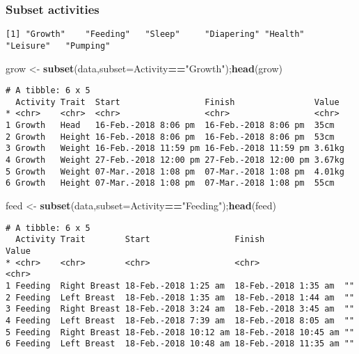 \documentclass[10,portrait]{article}
\newenvironment{Shaded}{\begin{snugshade}}{\end{snugshade}}
\newcommand{\KeywordTok}[1]{\textcolor[rgb]{0.13,0.29,0.53}{\textbf{#1}}}
\newcommand{\DataTypeTok}[1]{\textcolor[rgb]{0.13,0.29,0.53}{#1}}
\newcommand{\StringTok}[1]{\textcolor[rgb]{0.31,0.60,0.02}{#1}}
\newcommand{\OperatorTok}[1]{\textcolor[rgb]{0.81,0.36,0.00}{\textbf{#1}}}
\newcommand{\NormalTok}[1]{#1}
\begin{document}
\subsubsection{Subset activities}\label{subset-activities}

\begin{Shaded}
\end{Shaded}

\begin{verbatim}
[1] "Growth"    "Feeding"   "Sleep"     "Diapering" "Health"    "Leisure"   "Pumping"  
\end{verbatim}

\begin{Shaded}
\begin{Highlighting}[]
\NormalTok{grow <-}\StringTok{ }\KeywordTok{subset}\NormalTok{(data,}\DataTypeTok{subset=}\NormalTok{Activity}\OperatorTok{==}\StringTok{"Growth"}\NormalTok{);}\KeywordTok{head}\NormalTok{(grow)}
\end{Highlighting}
\end{Shaded}

\begin{verbatim}
# A tibble: 6 x 5
  Activity Trait  Start                 Finish                Value 
* <chr>    <chr>  <chr>                 <chr>                 <chr> 
1 Growth   Head   16-Feb.-2018 8:06 pm  16-Feb.-2018 8:06 pm  35cm  
2 Growth   Height 16-Feb.-2018 8:06 pm  16-Feb.-2018 8:06 pm  53cm  
3 Growth   Weight 16-Feb.-2018 11:59 pm 16-Feb.-2018 11:59 pm 3.61kg
4 Growth   Weight 27-Feb.-2018 12:00 pm 27-Feb.-2018 12:00 pm 3.67kg
5 Growth   Weight 07-Mar.-2018 1:08 pm  07-Mar.-2018 1:08 pm  4.01kg
6 Growth   Height 07-Mar.-2018 1:08 pm  07-Mar.-2018 1:08 pm  55cm  
\end{verbatim}

\begin{Shaded}
\begin{Highlighting}[]
\NormalTok{feed <-}\StringTok{ }\KeywordTok{subset}\NormalTok{(data,}\DataTypeTok{subset=}\NormalTok{Activity}\OperatorTok{==}\StringTok{"Feeding"}\NormalTok{);}\KeywordTok{head}\NormalTok{(feed)}
\end{Highlighting}
\end{Shaded}

\begin{verbatim}
# A tibble: 6 x 5
  Activity Trait        Start                 Finish                Value
* <chr>    <chr>        <chr>                 <chr>                 <chr>
1 Feeding  Right Breast 18-Feb.-2018 1:25 am  18-Feb.-2018 1:35 am  ""   
2 Feeding  Left Breast  18-Feb.-2018 1:35 am  18-Feb.-2018 1:44 am  ""   
3 Feeding  Right Breast 18-Feb.-2018 3:24 am  18-Feb.-2018 3:45 am  ""   
4 Feeding  Left Breast  18-Feb.-2018 7:39 am  18-Feb.-2018 8:05 am  ""   
5 Feeding  Right Breast 18-Feb.-2018 10:12 am 18-Feb.-2018 10:45 am ""   
6 Feeding  Left Breast  18-Feb.-2018 10:48 am 18-Feb.-2018 11:35 am ""   
\end{verbatim}
\end{document}
